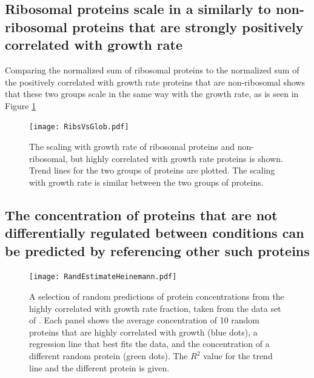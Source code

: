 \documentclass[notitlepage]{article}
\begin{document}
\subsection{Ribosomal proteins scale in a similarly to non-ribosomal proteins that are strongly positively correlated with growth rate}
Comparing the normalized sum of ribosomal proteins to the normalized sum of the positively correlated with growth rate proteins that are non-ribosomal shows that these two groups scale in the same way with the growth rate, as is seen in Figure \ref{fig:ribsnonribs}
\begin{figure}[H]
\centering
\texttt{[image: RibsVsGlob.pdf]}
\caption{
  The scaling with growth rate of ribosomal proteins and non-ribosomal, but highly correlated with growth rate proteins is shown.
Trend lines for the two groups of proteins are plotted.
The scaling with growth rate is similar between the two groups of proteins.
}
\label{fig:ribsnonribs}
\end{figure}

\subsection{The concentration of proteins that are not differentially regulated between conditions can be predicted by referencing other such proteins}

\begin{figure}[H]
\centering
\texttt{[image: RandEstimateHeinemann.pdf]}
\caption{
  A selection of random predictions of protein concentrations from the highly correlated with growth rate fraction, taken from the data set of \cite{Heinemann2014}.
  Each panel shows the average concentration of 10 random proteins that are highly correlated with growth (blue dots), a regression line that best fits the data, and the concentration of a different random protein (green dots).
  The $R^2$ value for the trend line and the different protein is given.
}
\label{fig:randpred}
\end{figure}

\printbibliography
\end{document}
